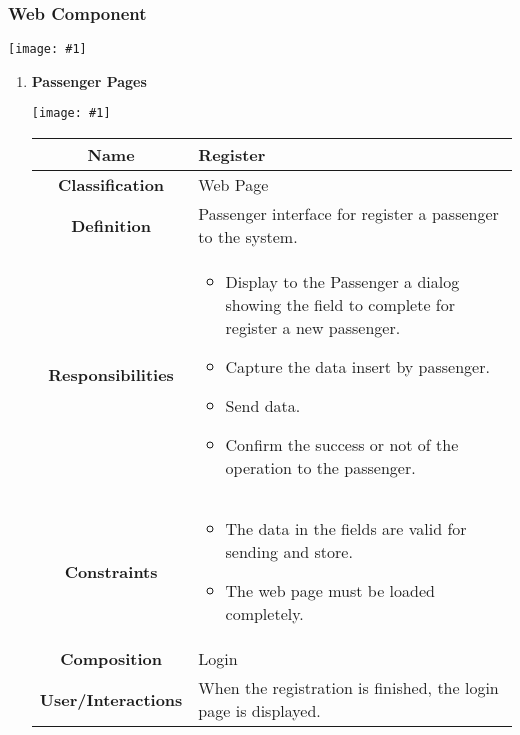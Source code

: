 \documentclass[11pt, a4paper,titlepage]{article}
\newcommand{\image}[1]{
	\begin{center}
		\noindent \texttt{[image: \#1]}
	\end{center}
	}
\begin{document}
\subsubsection{Web Component}
\image{page_component.png}
\newpage
\begin{enumerate}
\item \textbf{Passenger Pages}\\
\image{page_passenger.png}
	\begin{tabularx}{\textwidth}{| c | X |}
		\hline
		\textbf{Name} & 
		Register
		\\
		\hline
		\textbf{Classification} & 
	     Web Page
		\\
		\hline
		\textbf{Definition} & 
		Passenger interface for register a passenger to the system.\\
		\hline
		\textbf{Responsibilities} &
		\begin{itemize}
			\item Display to the Passenger a dialog showing the field to complete for register a new passenger.
			\item  Capture the data insert by passenger.
			\item Send data.
			\item Confirm the success or not of the operation to the passenger.
		\end{itemize}
		\\
		\hline
		\textbf{Constraints} & 
			\begin{itemize}
				\item  The data in the fields are valid for sending and store.
				\item The web page must be loaded completely.
			\end{itemize}
		\\
		\hline
		\textbf{Composition} & 
		Login
		\\
		\hline
		\textbf{User/Interactions} & 
	When the registration is finished, the login page is displayed.
		\\
		\hline	
	\end{tabularx}


\end{enumerate}
\end{document}
